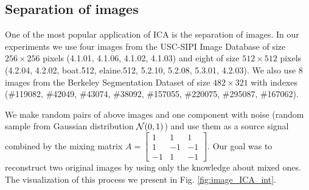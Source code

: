 \subsection{Separation of images}

One of the most popular application of ICA is the separation of images. In our experiments we use four images from the USC-SIPI Image Database of size $256 \times 256$ pixels (4.1.01, 4.1.06, 4.1.02, 4.1.03) and eight of size $512 \times 512$ pixels (4.2.04, 4.2.02, boat.512, elaine.512, 5.2.10, 5.2.08, 5.3.01, 4.2.03). We also use 8 images from the Berkeley Segmentation Dataset of size $482 \times 321$ with indexes (\#119082, \#42049, \#43074, \#38092, \#157055, \#220075, \#295087, \#167062). 

We make random pairs of above images and one component with noise (random sample from Gaussian distribution $\mathcal{N}(0,1)$) and use them as a source signal combined by the mixing matrix $A = \begin{bmatrix} 1 & 1 & 1  \\ 1 & -1 & -1 \\ -1 & 1 & -1  \end{bmatrix} $. Our goal was to reconstruct two original images by using only the knowledge about mixed ones. The visualization of this process we present in Fig. \ref{fig:image_ICA_int}. 

\begin{table}[t]
\label{tab:congru_img_1}
\vskip 0.15in
\begin{center}
\begin{small}
\begin{sc}
\end{sc}
\end{small}
\end{center}
\caption{Tucker's congruence coefficients between average edges form reference layers and various ICA results.}
\end{table}

